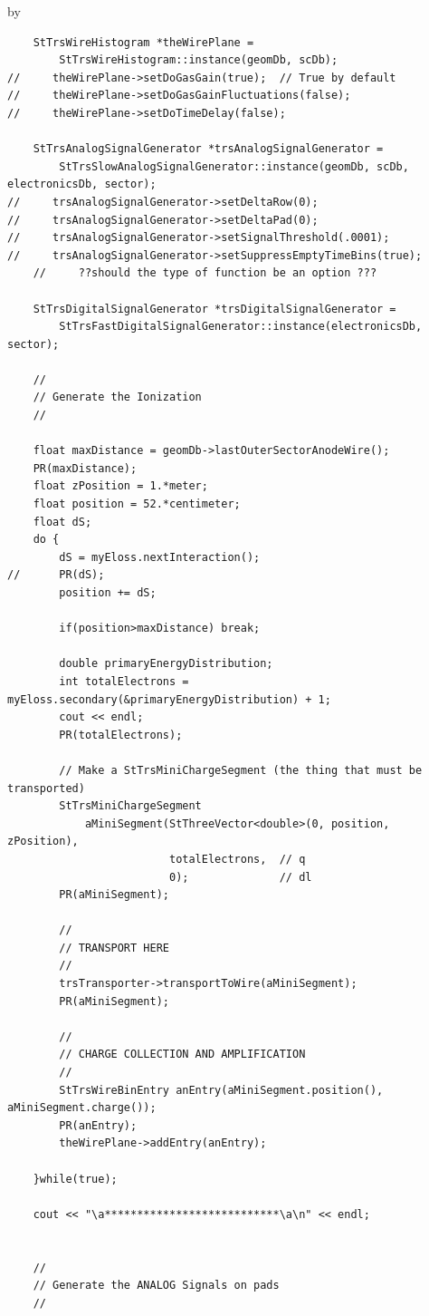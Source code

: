 \documentclass[twoside]{article}
\newcommand{\entrylabel}[1]{\mbox{\textbf{{#1}}}\hfil}%
\newenvironment{entry}
{\begin{list}{}%
    {\renewcommand{\makelabel}{\entrylabel}%
     \setlength{\labelwidth}{90pt}%
     \setlength{\leftmargin}{\labelwidth}
     \advance\leftmargin by \labelsep%
      }%
    }%
  {\end{list}}
\newcommand{\Entrylabel}[1]%
{\raisebox{0pt}[1ex][0pt]{\makebox[\labelwidth][l]%
    {\parbox[t]{\labelwidth}{\hspace{0pt}\textbf{{#1}}}}}}
\newenvironment{Entry}%
{\renewcommand{\entrylabel}{\Entrylabel}\begin{entry}}%
  {\end{entry}}
\begin{document}
\begin{Entry}
{\begin{verbatim}
    StTrsWireHistogram *theWirePlane =
        StTrsWireHistogram::instance(geomDb, scDb);
//     theWirePlane->setDoGasGain(true);  // True by default
//     theWirePlane->setDoGasGainFluctuations(false);
//     theWirePlane->setDoTimeDelay(false);

    StTrsAnalogSignalGenerator *trsAnalogSignalGenerator =
        StTrsSlowAnalogSignalGenerator::instance(geomDb, scDb, electronicsDb, sector);
//     trsAnalogSignalGenerator->setDeltaRow(0);
//     trsAnalogSignalGenerator->setDeltaPad(0);
//     trsAnalogSignalGenerator->setSignalThreshold(.0001);
//     trsAnalogSignalGenerator->setSuppressEmptyTimeBins(true);
    //     ??should the type of function be an option ???
        
    StTrsDigitalSignalGenerator *trsDigitalSignalGenerator =
        StTrsFastDigitalSignalGenerator::instance(electronicsDb, sector);

    //
    // Generate the Ionization
    //
    
    float maxDistance = geomDb->lastOuterSectorAnodeWire();
    PR(maxDistance);
    float zPosition = 1.*meter;
    float position = 52.*centimeter;
    float dS;
    do {
        dS = myEloss.nextInteraction();
//      PR(dS);
        position += dS;

        if(position>maxDistance) break;

        double primaryEnergyDistribution;
        int totalElectrons = myEloss.secondary(&primaryEnergyDistribution) + 1;
        cout << endl;
        PR(totalElectrons);

        // Make a StTrsMiniChargeSegment (the thing that must be transported)
        StTrsMiniChargeSegment
            aMiniSegment(StThreeVector<double>(0, position, zPosition),
                         totalElectrons,  // q
                         0);              // dl
        PR(aMiniSegment);

        //
        // TRANSPORT HERE
        //
        trsTransporter->transportToWire(aMiniSegment);
        PR(aMiniSegment);

        //
        // CHARGE COLLECTION AND AMPLIFICATION
        //
        StTrsWireBinEntry anEntry(aMiniSegment.position(), aMiniSegment.charge());
        PR(anEntry);
        theWirePlane->addEntry(anEntry);
        
    }while(true);

    cout << "\a***************************\a\n" << endl;

    
    //
    // Generate the ANALOG Signals on pads
    //   
    

\end{verbatim}}
\end{Entry}
\end{document}
